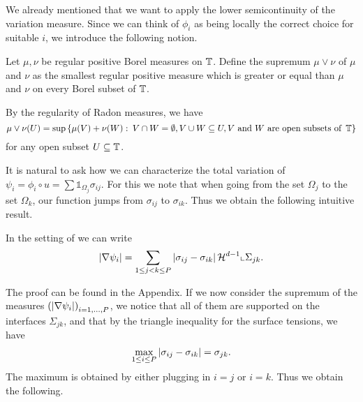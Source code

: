 We already mentioned that we want to apply the lower semicontinuity of the variation measure. Since we can think of $ \phi_{ i } $ as being locally the correct choice for suitable $ i $, we introduce the following notion.

\begin{definition}
	Let $ \mu , \nu $ be regular positive Borel measures on $ \operatorname{\mathbb{T}} $. 
	Define the supremum $ \mu \vee \nu $ of $ \mu $ and $ \nu $ as the smallest 
	regular positive measure which is greater or equal than $ \mu $ and $ \nu $ 
	on every Borel subset of $ \operatorname{\mathbb{T}} $. 
\end{definition}

\begin{remark}
By the regularity of Radon 
	measures, we have
	\begin{equation*}
		\mu \vee \nu ( U ) 
		=
		\sup \left\{
			\mu ( V ) + \nu ( W )
			\, \colon \,
			V \cap W = \emptyset,
			V \cup W \subseteq U, 
			V \text{ and } W \text{ are open subsets of } \operatorname{\mathbb{T}}
		\right\}
	\end{equation*}
	for any open subset $ U \subseteq \operatorname{\mathbb{T}} $.
\end{remark}

It is natural to ask how we can characterize the total variation of $ \psi_{ i 
} = \phi_{ i } \circ u = \sum \mathds{ 1 }_{ \Omega_{ j } } \sigma_{ i j } $. 
For this we note that when going from the set $ \Omega_{ j } $ to the set $ 
\Omega_{ k } $, 
our function jumps from $ \sigma_{ i j } $ to $ \sigma_{ i k } $. Thus we 
obtain the following intuitive result.

\begin{lemma}
	\label{rewriting_variation_of_psi_i}
	In the setting of  we can write
	\begin{equation*}
		\abs{ \nabla \psi_{ i } }
		=
		\sum_{ 1 \leq j < k \leq P }
			\abs{ \sigma_{ i j } - \sigma_{ i k } }
			\operatorname{\mathcal{H}}^{ d - 1 } \llcorner{ \Sigma_{ j k } } .
	\end{equation*}
\end{lemma}

The proof can be found in the Appendix. If we now consider the supremum of the 
measures $ \left( \abs{ \nabla \psi_{ i } } \right)_{ i = 1 , \dotsc, P } $, we 
notice that all of them are supported on the interfaces $ \Sigma_{ j k } $, and 
that by the triangle inequality for the surface tensions, we have 
\begin{equation}
	\label{maximum_of_differences_of_surface_tensions}
	\max_{ 1 \leq i \leq P }
		\abs{ \sigma_{ i j } - \sigma_{ i k } }
	=
	\sigma_{ j k }.
\end{equation}
The maximum is obtained by either plugging in $ i = j $ or $ i = k $. Thus we 
obtain the following.

